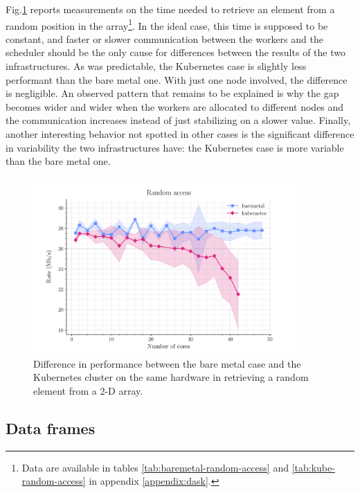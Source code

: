 Fig.\ref{fig:array-random-access} reports measurements on the time needed to
retrieve an element from a random position in the array\footnote{Data are
available in tables \ref{tab:baremetal-random-access} and
\ref{tab:kube-random-access} in appendix \ref{appendix:dask}.}. In the ideal
case, this time is supposed to be constant, and faster or slower communication
between the workers and the scheduler should be the only cause for differences
between the results of the two infrastructures. As was predictable, the
Kubernetes case is slightly less performant than the bare metal one. With just
one node involved, the difference is negligible. An observed pattern that
remains to be explained is why the gap becomes wider and wider when the workers
are allocated to different nodes and the communication increases instead of just
stabilizing on a slower value. Finally, another interesting behavior not spotted
in other cases is the significant difference in variability the two
infrastructures have: the Kubernetes case is more variable than the bare metal
one.

\begin{figure}
  \centering
  \includegraphics[width=0.9\textwidth]{img/chpt4/array-random-access}
  \caption{Difference in performance between the bare metal case and the
    Kubernetes cluster on the same hardware in retrieving a random element from
    a 2-D array.}
  \label{fig:array-random-access}
\end{figure}

\subsection{Data frames}


